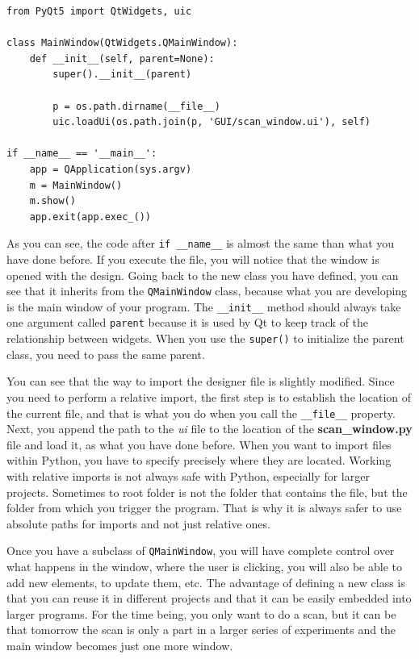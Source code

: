 \begin{verbatim}
from PyQt5 import QtWidgets, uic

class MainWindow(QtWidgets.QMainWindow):
    def __init__(self, parent=None):
        super().__init__(parent)

        p = os.path.dirname(__file__)
        uic.loadUi(os.path.join(p, 'GUI/scan_window.ui'), self)

if __name__ == '__main__':
    app = QApplication(sys.argv)
    m = MainWindow()
    m.show()
    app.exit(app.exec_())
\end{verbatim}

As you can see, the code after \texttt{if __name__} is almost the
same than what you have done before. If you execute the file, you will
notice that the window is opened with the design. Going back to the new
class you have defined, you can see that it inherits from the
\texttt{QMainWindow} class, because what you are developing is the main
window of your program. The \texttt{__init__} method should always
take one argument called \texttt{parent} because it is used by Qt to
keep track of the relationship between widgets. When you use the
\texttt{super()} to initialize the parent class, you need to pass the
same parent.

You can see that the way to import the designer file is slightly
modified. Since you need to perform a relative import, the first step is
to establish the location of the current file, and that is what you do
when you call the \texttt{__file__} property. Next, you append the
path to the \emph{ui} file to the location of the
\textbf{scan\_window.py} file and load it, as what you have done before.
When you want to import files within Python, you have to specify
precisely where they are located. Working with relative imports is not
always safe with Python, especially for larger projects. Sometimes to
root folder is not the folder that contains the file, but the folder
from which you trigger the program. That is why it is always safer to
use absolute paths for imports and not just relative ones.

Once you have a subclass of \texttt{QMainWindow}, you will have complete
control over what happens in the window, where the user is clicking, you
will also be able to add new elements, to update them, etc. The
advantage of defining a new class is that you can reuse it in different
projects and that it can be easily embedded into larger programs. For
the time being, you only want to do a scan, but it can be that tomorrow
the scan is only a part in a larger series of experiments and the main
window becomes just one more window.


